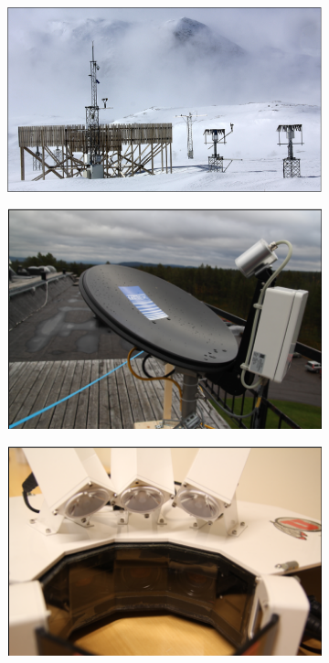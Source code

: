\begin{figure}
	\centering
	\begin{subfigure}[b]{0.4\textwidth}
		\includegraphics[width=\textwidth]{./fig_instruments/Dofe.png}
		\caption{}\label{fig:Dofe}
	\end{subfigure}
	\begin{subfigure}[b]{0.4\textwidth}
		\includegraphics[width=\textwidth]{./fig_instruments/MRR.png}
		\caption{}\label{fig:MRR}
	\end{subfigure}
	\begin{subfigure}[b]{0.4\textwidth}
		\includegraphics[width=\textwidth]{./fig_instruments/MASC.png}

\end{subfigure}
\end{figure}
